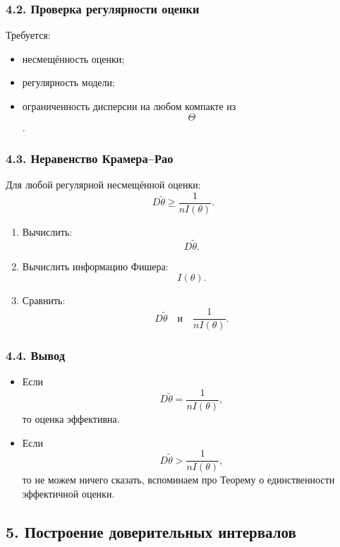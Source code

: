 \documentclass{article}
\begin{document}
\subsubsection*{4.2. Проверка регулярности оценки}

Требуется:
\begin{itemize}
    \item несмещённость оценки;
    \item регулярность модели;
    \item ограниченность дисперсии на любом компакте из \[\Theta\].
\end{itemize}

\subsubsection*{4.3. Неравенство Крамера--Рао}

Для любой регулярной несмещённой оценки:
\[
D\widetilde{\theta}
\ge
\frac1{nI(\theta)}.
\]

\begin{enumerate}
    \item Вычислить:
    \[
    D \widetilde{\theta}.
    \]

    \item Вычислить информацию Фишера:
    \[
    I(\theta).
    \]

    \item Сравнить:
    \[
    D \widetilde{\theta}
    \quad \text{и} \quad
    \frac1{nI(\theta)}.
    \]
\end{enumerate}

\subsubsection*{4.4. Вывод}

\begin{itemize}
    \item Если
    \[
    D \widetilde{\theta}
    =
    \frac1{nI(\theta)},
    \]
    то оценка эффективна.

    \item Если
    \[
    D\widetilde{\theta}
    >
    \frac1{nI(\theta)},
    \]
    то не можем ничего сказать, вспоминаем про Теорему о единственности эффектичной оценки.
\end{itemize}

\subsection*{5. Построение доверительных интервалов}
\end{document}
